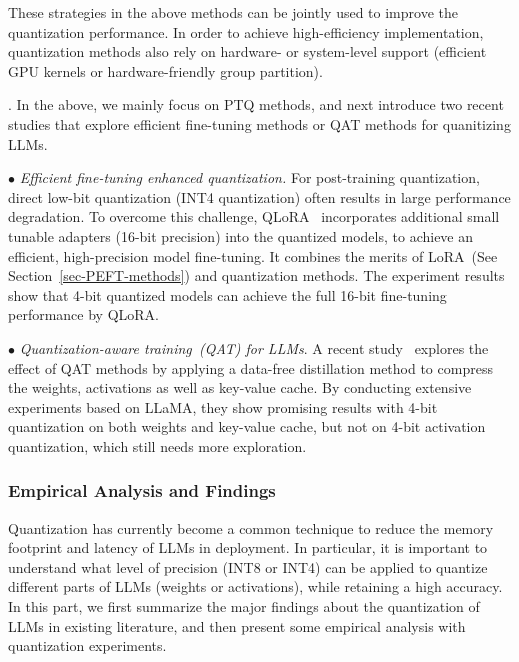 %


  


%


These strategies in the above methods can be jointly used to improve the quantization performance. 
{In order to achieve high-efficiency implementation, quantization methods also rely on hardware- or system-level support (\eg efficient GPU kernels or hardware-friendly group partition). %
} 


. In the above, we mainly focus on PTQ methods, and next introduce two recent studies that explore efficient fine-tuning methods or QAT methods   for quanitizing LLMs. 
   

$\bullet$ \emph{Efficient fine-tuning enhanced quantization.} 
For post-training quantization, direct low-bit  quantization (\eg INT4 quantization) often results in large performance degradation.  To overcome this challenge, QLoRA~\cite{Dettmers-CoRR-2023-QLoRA} 
incorporates additional small tunable  adapters (16-bit precision) into the quantized models,  to achieve an efficient, high-precision model fine-tuning.  
It combines the merits of LoRA~(See Section~\ref{sec-PEFT-methods}) and quantization methods. The experiment results show that 4-bit quantized  models can 
achieve the full 16-bit fine-tuning performance by QLoRA.



$\bullet$ \emph{Quantization-aware training~(QAT) for LLMs}. A recent study~\cite{liu-2023-arxiv-LLM-QAT} explores the effect of QAT methods by applying a data-free distillation method to compress the weights, activations as well as key-value cache. By conducting extensive experiments based on LLaMA, they show promising results with 4-bit quantization on both weights and key-value cache, but not on 4-bit activation quantization, which still needs more exploration. 





\subsubsection{Empirical Analysis and Findings}
\label{sec:quantization_empirical}
Quantization has currently become a common technique to reduce the memory footprint and latency of LLMs in deployment. 
In particular, it is important to understand what level of precision (\eg INT8 or INT4) can be applied to quantize different parts of LLMs (\eg weights or activations), while retaining  a high accuracy. 
In this part, we first summarize the major findings about the quantization of LLMs in existing literature, and then present some empirical analysis with quantization experiments.  

